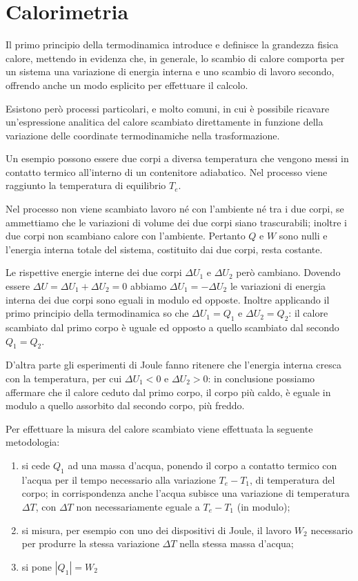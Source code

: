 \documentclass[class=book, crop=false, oneside, 12pt]{standalone}
\begin{document}
\section{Calorimetria}
Il primo principio della termodinamica introduce e definisce la grandezza fisica calore, mettendo in evidenza che, in generale, lo scambio di calore comporta per un sistema una variazione di energia interna e uno scambio di lavoro secondo, offrendo anche un modo esplicito per effettuare il calcolo.

Esistono però processi particolari, e molto comuni, in cui è possibile ricavare un'espressione analitica del calore scambiato direttamente in funzione della variazione delle coordinate termodinamiche nella trasformazione.

Un esempio possono essere due corpi a diversa temperatura che vengono messi in contatto termico all'interno di un contenitore adiabatico. 
Nel processo viene raggiunto la temperatura di equilibrio \(T_e\).

Nel processo non viene scambiato lavoro né con l'ambiente né tra i due corpi, se ammettiamo che le variazioni di volume dei due corpi siano trascurabili; inoltre i due corpi non scambiano calore con l'ambiente. 
Pertanto \(Q\) e \(W\) sono nulli e l'energia interna totale del sistema, costituito dai due corpi, resta costante.

Le rispettive energie interne dei due corpi \(\Delta U_1\) e \(\Delta U_2\) però cambiano.
Dovendo essere \(\Delta U = \Delta U_1 + \Delta U_2 = 0\) abbiamo \(\Delta U_1 = - \Delta U_2\) le variazioni di energia interna dei due corpi sono eguali in modulo ed opposte.
Inoltre applicando il primo principio della termodinamica so che \(\Delta U_1 = Q_1\) e \(\Delta U_2 = Q_2\): il calore scambiato dal primo corpo è uguale ed opposto a quello scambiato dal secondo \(Q_1 = Q_2\).

D'altra parte gli esperimenti di Joule fanno ritenere che l'energia interna cresca con la temperatura, per cui \(\Delta U_1 < 0 \) e \(\Delta U_2 > 0 \):
in conclusione possiamo affermare che il calore ceduto dal primo corpo, il corpo più caldo, è eguale in modulo a quello assorbito dal secondo corpo, più freddo. 

Per effettuare la misura del calore scambiato viene effettuata la seguente metodologia:
\begin{enumerate}
    \item si cede \(Q_1\) ad una massa d'acqua, ponendo il corpo a contatto termico con l'acqua per il tempo necessario alla variazione \(T_e - T_1\), di temperatura del corpo; 
    in corrispondenza anche l'acqua subisce una variazione di temperatura \(\Delta T\), con \(\Delta T\) non necessariamente eguale a \(T_e - T_1\) (in modulo);
    \item si misura, per esempio con uno dei dispositivi di Joule, il lavoro \(W_2\) necessario per produrre la stessa variazione \(\Delta T\) nella stessa massa d'acqua; 
    \item si pone \(| Q_1 | = W_2\)
\end{enumerate}
\end{document}
